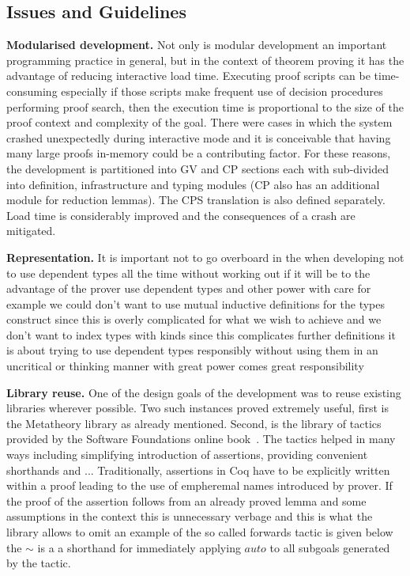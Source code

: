 \subsection{Issues and Guidelines}

\textbf{Modularised development.} Not only is modular development an important
programming practice in general, but in the context of theorem proving it has
the advantage of reducing interactive load time. Executing proof scripts can
be time-consuming especially if those scripts make frequent use of decision
procedures performing proof search, then the execution time is proportional to
the size of the proof context and complexity of the goal. There were cases in
which the system crashed unexpectedly during interactive mode and it is
conceivable that having many large proofs in-memory could be a contributing
factor. For these reasons, the development is partitioned into GV and CP
sections each with sub-divided into definition, infrastructure and typing
modules (CP also has an additional module for reduction lemmas). The CPS
translation is also defined separately. Load time is considerably improved and
the consequences of a crash are mitigated.

\textbf{Representation.} It is important not to go overboard in the
when developing not to use dependent types all the time without working out if
it will be to the advantage of the prover use dependent types and other power
with care for example we could don't want to use mutual inductive definitions
for the types construct since this is overly complicated for what we wish to
achieve and we don't want to index types with kinds since this complicates
further definitions it is about trying to use dependent types responsibly
without using them in an uncritical or thinking manner with great power comes
great responsibility

\textbf{Library reuse.} One of the design goals of the development was to
reuse existing libraries wherever possible. Two such instances proved
extremely useful, first is the Metatheory library as already
mentioned. Second, is the library of tactics provided by the Software
Foundations online book~\cite{SF}.  The tactics helped in many ways including
simplifying introduction of assertions, providing convenient shorthands and
... Traditionally, assertions in Coq have to be explicitly written within a
proof leading to the use of empheremal names introduced by prover. If the
proof of the assertion follows from an already proved lemma and some
assumptions in the context this is unnecessary verbage and this is what the
library allows to omit  an example
of the so called forwards tactic is given below the $\sim$ is a a shorthand
for immediately applying \coqe$auto$ to all subgoals generated by the tactic.

